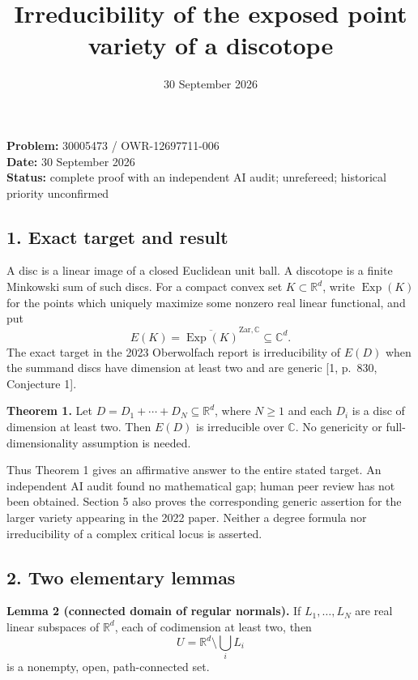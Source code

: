 \documentclass[
  11pt,
  letterpaper,
]{article}
\title{Irreducibility of the exposed point variety of a discotope}
\author{}
\date{30 September 2026}
\begin{document}
\maketitle

\textbf{Problem:} 30005473 / OWR-12697711-006\\
\textbf{Date:} 30 September 2026\\
\textbf{Status:} complete proof with an independent AI audit;
unrefereed; historical priority unconfirmed

\subsection{1. Exact target and result}\label{exact-target-and-result}

A disc is a linear image of a closed Euclidean unit ball. A discotope is
a finite Minkowski sum of such discs. For a compact convex set
\(K\subset\mathbb R^d\), write \(\operatorname{Exp}(K)\) for the points
which uniquely maximize some nonzero real linear functional, and put \[
E(K)=\overline{\operatorname{Exp}(K)}^{\mathrm{Zar},\mathbb C}\subseteq\mathbb C^d.
\] The exact target in the 2023 Oberwolfach report is irreducibility of
\(E(D)\) when the summand discs have dimension at least two and are
generic {[}1, p.~830, Conjecture 1{]}.

\textbf{Theorem 1.} Let \(D=D_1+\cdots+D_N\subseteq\mathbb R^d\), where
\(N\geq1\) and each \(D_i\) is a disc of dimension at least two. Then
\(E(D)\) is irreducible over \(\mathbb C\). No genericity or
full-dimensionality assumption is needed.

Thus Theorem 1 gives an affirmative answer to the entire stated target.
An independent AI audit found no mathematical gap; human peer review has
not been obtained. Section 5 also proves the corresponding generic
assertion for the larger variety appearing in the 2022 paper. Neither a
degree formula nor irreducibility of a complex critical locus is
asserted.

\subsection{2. Two elementary lemmas}\label{two-elementary-lemmas}

\textbf{Lemma 2 (connected domain of regular normals).} If
\(L_1,\ldots,L_N\) are real linear subspaces of \(\mathbb R^d\), each of
codimension at least two, then \[
U=\mathbb R^d\setminus\bigcup_i L_i
\] is a nonempty, open, path-connected set.
\end{document}
